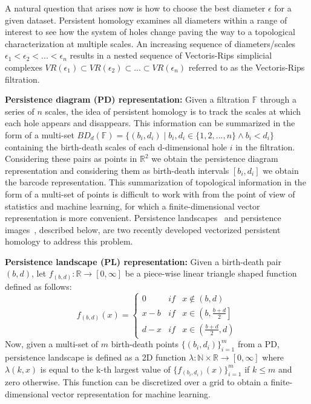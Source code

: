 \documentclass{article}
\begin{document}
\noindent A natural question that arises now is how to choose the best diameter $\epsilon$ for a given dataset. Persistent homology examines all diameters within a range of interest to see how the system of holes change paving the way to a topological characterization at multiple scales. An increasing sequence of diameters/scales $\epsilon_1 < \epsilon_2 < ... < \epsilon_n$ results in a nested sequence of Vectoris-Rips simplicial complexes $VR(\epsilon_1) \subset VR(\epsilon_2) \subset ... \subset VR(\epsilon_n)$ referred to as the Vectoris-Rips filtration.

\smallskip
\noindent \textbf{Persistence diagram (PD) representation:} Given a filtration $\mathbb{F}$ through a series of $n$ scales, the idea of persistent homology is to track the scales at which each hole appears and disappears. This information can be summarized in the form of a multi-set $BD_d(\mathbb{F}) = \{(b_i, d_i) \mid b_i, d_i \in \{1, 2, ..., n\} \land b_i < d_i \}$  containing the birth-death scales of each d-dimensional hole $i$ in the filtration. Considering these pairs as points in $\mathbb{R}^2$ we obtain the persistence diagram representation and considering them as birth-death intervals $[b_i, d_i]$ we obtain the barcode representation. This summarization of topological information in the form of a multi-set of points is difficult to work with from the point of view of statistics and machine learning, for which a finite-dimensional vector representation is more convenient. Persistence landscapes~\cite{Adams2015} and persistence images~\cite{Bubenik2012}, described below, are two recently developed vectorized persistent homology to address this problem.

\smallskip 
\noindent \textbf{Persistence landscape (PL) representation:} Given a birth-death pair $(b,d)$, let $f_{(b,d)}: \mathbb{R} \to [0, \infty]$ be a piece-wise linear triangle shaped function defined as follows:
\begin{equation}
f_{(b,d)}\left ( x \right ) = \left\{\begin{array}{lll}
 0 & if & x \notin \left(b,d\right)\\ 
 x - b & if & x \in \left(b, \frac{b + d}{2}\right]\\ 
 d - x & if & x \in \left(\frac{b + d}{2}, d\right)
\end{array}\right.    
\end{equation}
Now, given a multi-set of $m$ birth-death points $\{(b_i, d_i)\}_{i=1}^{m}$ from a PD, persistence landscape is defined as a 2D function $\lambda : \mathbb{N} \times \mathbb{R} \to [0, \infty]$ where $\lambda(k, x)$ is equal to the k-th largest value of $\{f_{(b_i, d_i)}\left(x\right)\}_{i=1}^{m}$ if $k \leq m$ and zero otherwise. This function can be discretized over a grid to obtain a finite-dimensional vector representation for machine learning.
\end{document}
